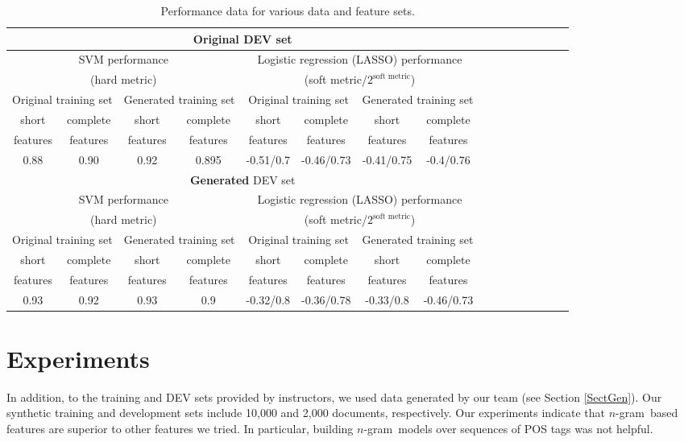 \documentclass[11pt]{article}
\newcommand{\ngram}{\mbox{$n$-gram }}
\begin{document}
\begin{table}
\caption{\label{TablePerf}  Performance data for various data and feature sets.}
\begin{tabular}{c|c|c|c|c|c|c|c|c|c|c|c|c|c|c|c}\hline
\multicolumn{8}{c}{\textbf{Original} DEV set} \\\hline\hline
\multicolumn{4}{c|}{SVM performance } & \multicolumn{4}{c}{Logistic regression (LASSO) performance } \\
\multicolumn{4}{c|}{(hard metric)} & \multicolumn{4}{c}{(soft metric/$2^{\mbox{soft metric}}$)} \\\hline\hline
\multicolumn{2}{c|}{Original training set} & \multicolumn{2}{c|}{Generated training set}
&
\multicolumn{2}{c|}{Original training set} & \multicolumn{2}{c}{Generated training set}
\\\hline
short & complete & short & complete  &
short & complete & short & complete  \\
features & features & features & features &
features & features & features & features \\\hline
0.88  & 0.90 & 0.92 &  0.895  & -0.51/0.7 & -0.46/0.73 & -0.41/0.75 & -0.4/0.76

\\\hline
\multicolumn{8}{c}{\textbf{Generated} DEV set} \\\hline\hline
\multicolumn{4}{c|}{SVM performance } & \multicolumn{4}{c}{Logistic regression (LASSO) performance } \\
\multicolumn{4}{c|}{(hard metric)} & \multicolumn{4}{c}{(soft metric/$2^{\mbox{soft metric}}$)} \\\hline\hline
\multicolumn{2}{c|}{Original training set} & \multicolumn{2}{c|}{Generated training set} &
\multicolumn{2}{c|}{Original training set} & \multicolumn{2}{c}{Generated training set} \\\hline
short & complete & short & complete  &
short & complete & short & complete  \\
features & features & features & features &
features & features & features & features \\\hline
0.93 & 0.92   & 0.93 & 0.9  & -0.32/0.8  & -0.36/0.78 & -0.33/0.8 & -0.46/0.73\\\hline
\end{tabular}
\end{table}

\section{Experiments}
In addition, to the training and DEV sets provided by instructors,
we used data generated by our team (see Section \ref{SectGen}).
Our synthetic training and development sets include 10,000 and 2,000 documents, respectively.
Our experiments indicate that
\ngram based features are superior to other features we tried.
In particular, building \ngram models over sequences of POS tags was not helpful.
\end{document}
